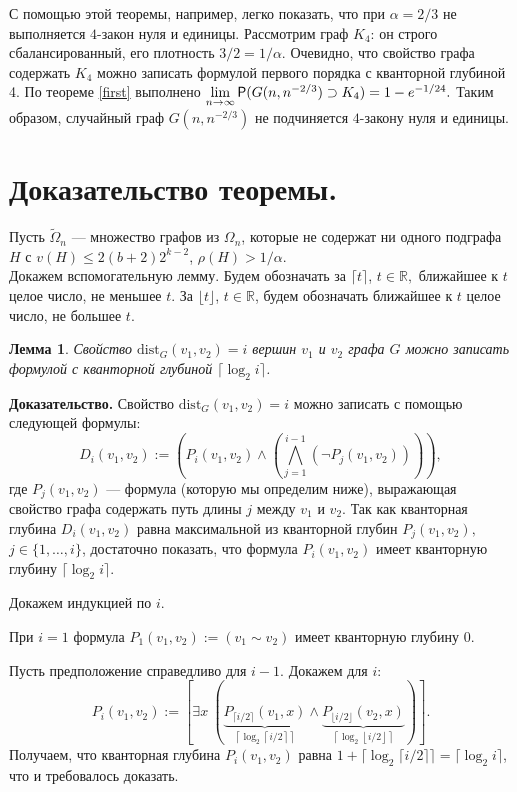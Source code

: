 \documentclass[12pt,a4paper,russian,titlepage]{article}
\newtheorem{Lem}{Лемма}
\begin{document}
С помощью этой теоремы, например, легко показать, что при $\alpha = 2/3$ не выполняется $4$-закон нуля и единицы.
Рассмотрим граф $K_{4}$: он строго сбалансированный, его плотность $3/2 = 1/\alpha.$ Очевидно, что свойство графа содержать $K_4$ можно записать формулой первого порядка с кванторной глубиной 4. По теореме \ref{first} выполнено $\lim\limits_{n\rightarrow\infty}{\sf P}(G(n,n^{-2/3})\supset K_4)=1-e^{-1/24}.$ Таким образом, случайный граф $G(n,n^{-2/3})$ не подчиняется $4$-закону нуля и единицы.


\section{Доказательство теоремы.}\label{proof_theorem}

Пусть $\tilde\Omega_n$ --- множество графов из $\Omega_n$, которые не содержат ни одного подграфа $H$ с $v(H)\leq 2(b+2)2^{k-2}$, $\rho(H)>1/\alpha$.\\


Докажем вспомогательную лемму. Будем обозначать за $\lceil t \rceil$, $t\in \mathbb{R},$ ближайшее к $t$ целое число, не меньшее $t$. За $\lfloor t \rfloor$, $t \in \mathbb{R}$, будем обозначать ближайшее к $t$ целое число, не большее $t$.

\begin{Lem}
Свойство $\mathrm{dist}_G(v_1,v_2) = i$ вершин $v_1$ и $v_2$ графа $G$ можно записать формулой с кванторной глубиной $\lceil\log_2 i\rceil$.
\label{lemma}
\end{Lem}
{\bf Доказательство.}
Свойство $\mathrm{dist}_G(v_1,v_2) = i$ можно записать с помощью следующей формулы:
$$
 D_i(v_1, v_2) := \left(P_i(v_1, v_2) \wedge \left(\bigwedge_{j = 1}^{i-1} (\neg P_j(v_1,v_2))\right)\right),
$$
где $P_j(v_1,v_2)$ --- формула (которую мы определим ниже), выражающая свойство графа содержать путь длины $j$ между $v_1$ и $v_2$. Так как кванторная глубина $D_i(v_1,v_2)$ равна максимальной из кванторной глубин $P_j(v_1,v_2),$ $j\in \{1,\dots,i\}$, достаточно показать, что формула $P_i(v_1,v_2)$ имеет кванторную глубину $\lceil\log_2 i\rceil.$

Докажем индукцией по $i$.

При $i = 1$ формула $P_{1}(v_1,v_2) := (v_1\sim v_2)$ имеет кванторную глубину 0.

Пусть предположение справедливо для $i - 1.$ Докажем для $i:$
$$
 P_i(v_1, v_2) := [\exists x\         (\underbrace{P_{\lceil i/2\rceil}(v_1, x)}_{\left\lceil \log_2 \left\lceil i/2 \right\rceil \right\rceil}        \wedge \underbrace{P_{\lfloor i/2\rfloor}(v_2, x)}_{\left\lceil \log_2\left\lfloor i/2\right\rfloor \right\rceil})].
$$
Получаем, что кванторная глубина $P_i(v_1, v_2)$ равна $1 + \lceil \log_2 \lceil i/2\rceil \rceil = \lceil\log_2 i\rceil$, что и требовалось доказать.\\
\end{document}
